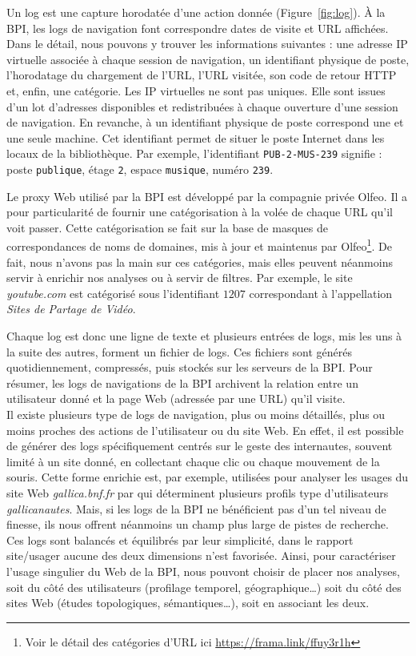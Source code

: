 \documentclass[symmetric,justified,marginals=raggedouter]{tufte-book}
\begin{document}
Un log est une capture horodatée d'une action donnée (Figure~\ref{fig:log}). À la BPI, les logs de navigation font correspondre dates de visite et URL affichées. Dans le détail, nous pouvons y trouver les informations suivantes : une adresse IP virtuelle associée à chaque session de navigation, un identifiant physique de poste, l'horodatage du chargement de l'URL, l'URL visitée, son code de retour HTTP et, enfin, une catégorie. Les IP virtuelles ne sont pas uniques. Elle sont issues d'un lot d'adresses disponibles et redistribuées à chaque ouverture d'une session de navigation. En revanche, à un identifiant physique de poste correspond une et une seule machine. Cet identifiant permet de situer le poste Internet dans les locaux de la bibliothèque. Par exemple, l'identifiant \texttt{PUB-2-MUS-239} signifie : poste \texttt{publique}, étage \texttt{2}, espace \texttt{musique}, numéro \texttt{239}.  

Le proxy Web utilisé par la BPI est développé par la compagnie privée Olfeo. Il a pour particularité de fournir une catégorisation à la volée de chaque URL qu'il voit passer. Cette catégorisation se fait sur la base de masques de correspondances de noms de domaines, mis à jour et maintenus par Olfeo\footnote{\RaggedOuter Voir le détail des catégories d'URL ici \url{https://frama.link/ffuy3r1h}}. De fait, nous n'avons pas la main sur ces catégories, mais elles peuvent néanmoins servir à enrichir nos analyses ou à servir de filtres. Par exemple, le site \textit{youtube.com} est catégorisé sous l'identifiant $1207$ correspondant à l'appellation \textit{Sites de Partage de Vidéo}.

Chaque log est donc une ligne de texte et plusieurs entrées de logs, mis les uns à la suite des autres, forment un fichier de logs. Ces fichiers sont générés quotidiennement, compressés, puis stockés sur les serveurs de la BPI. Pour résumer, les logs de navigations de la BPI archivent la relation entre un utilisateur donné et la page Web (adressée par une URL) qu'il visite. \\

\noindent Il existe plusieurs type de logs de navigation, plus ou moins détaillés, plus ou moins proches des actions de l'utilisateur ou du site Web. En effet, il est possible de générer des logs spécifiquement centrés sur le geste des internautes, souvent limité à un site donné, en collectant chaque clic ou chaque mouvement de la souris. Cette forme enrichie est, par exemple, utilisées pour analyser les usages du site Web \textit{gallica.bnf.fr} par \citep{beaudouin_je_2016} qui déterminent plusieurs profils type d'utilisateurs \textit{gallicanautes}. Mais, si les logs de la BPI ne bénéficient pas d'un tel niveau de finesse, ils nous offrent néanmoins un champ plus large de pistes de recherche. Ces logs sont balancés et équilibrés par leur simplicité, dans le rapport site/usager aucune des deux dimensions n'est favorisée. Ainsi, pour caractériser l'usage singulier du Web de la BPI, nous pouvont choisir de placer nos analyses, soit du côté des utilisateurs (profilage temporel, géographique\ldots{}) soit du côté des sites Web (études topologiques, sémantiques\ldots{}), soit en associant les deux.
\end{document}
